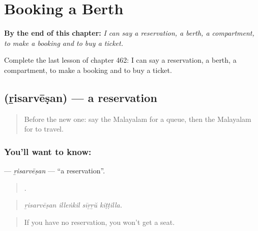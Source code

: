 
\chapter{Booking a Berth}
\label{ch:ml-booking-a-berth}

\begin{chapteropening}
\textbf{By the end of this chapter:} \emph{I can say a reservation, a berth, a compartment, to make a booking and to buy a ticket.}

Complete the last lesson of chapter 462: I can say a reservation, a berth, a compartment, to make a booking and to buy a ticket.
\end{chapteropening}

\section[\texorpdfstring{\ml{റിസർവേഷൻ} (ṟisarvēṣan)}{റിസർവേഷൻ (ṟisarvēṣan)}]{ (ṟisarvēṣan) — a reservation}

\label{lesson:ML-C462-risarvesan}



\begin{quote}
Before the new one: say the Malayalam for a queue, then the Malayalam for to travel.
\end{quote}

\subsection*{You'll want to know: }
\textbf{} — \emph{ṟisarvēṣan} — \textquotedblleft{}a reservation\textquotedblright{}.

\begin{quote}
   .
\end{quote}

\begin{quote}
\emph{ṟisarvēṣan illeṅkil sīṟṟŭ kiṭṭilla.}
\end{quote}

\begin{quote}
If you have no reservation, you won't get a seat.
\end{quote}

